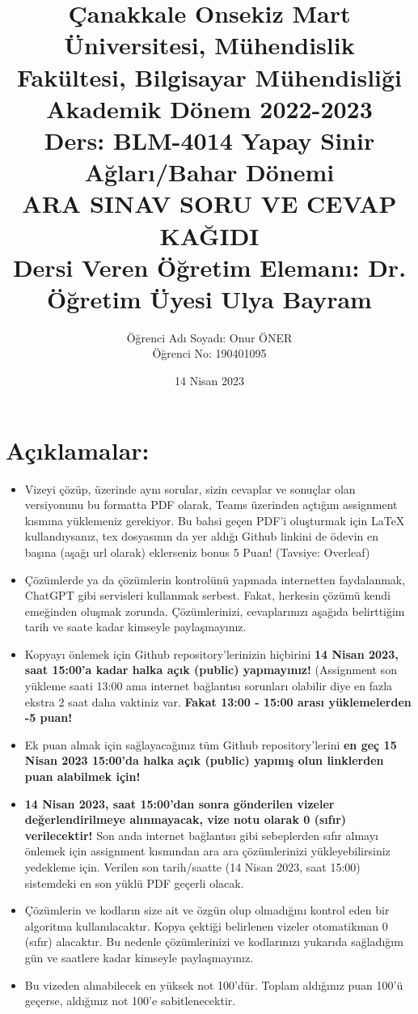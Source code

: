 \documentclass[11pt]{article}
\title{Çanakkale Onsekiz Mart Üniversitesi, Mühendislik Fakültesi, Bilgisayar Mühendisliği Akademik Dönem 2022-2023\\
Ders: BLM-4014 Yapay Sinir Ağları/Bahar Dönemi\\ 
ARA SINAV SORU VE CEVAP KAĞIDI\\
Dersi Veren Öğretim Elemanı: Dr. Öğretim Üyesi Ulya Bayram}
\author{%
\begin{minipage}{\textwidth}
\raggedright
Öğrenci Adı Soyadı: Onur ÖNER\\ %
Öğrenci No: 190401095
\end{minipage}%
}
\date{14 Nisan 2023}
\begin{document}
\maketitle

\vspace{-.5in}
\section*{Açıklamalar:}
\begin{itemize}
    \item Vizeyi çözüp, üzerinde aynı sorular, sizin cevaplar ve sonuçlar olan versiyonunu bu formatta PDF olarak, Teams üzerinden açtığım assignment kısmına yüklemeniz gerekiyor. Bu bahsi geçen PDF'i oluşturmak için LaTeX kullandıysanız, tex dosyasının da yer aldığı Github linkini de ödevin en başına (aşağı url olarak) eklerseniz bonus 5 Puan! (Tavsiye: Overleaf)
    \item Çözümlerde ya da çözümlerin kontrolünü yapmada internetten faydalanmak, ChatGPT gibi servisleri kullanmak serbest. Fakat, herkesin çözümü kendi emeğinden oluşmak zorunda. Çözümlerinizi, cevaplarınızı aşağıda belirttiğim tarih ve saate kadar kimseyle paylaşmayınız. 
    \item Kopyayı önlemek için Github repository'lerinizin hiçbirini \textbf{14 Nisan 2023, saat 15:00'a kadar halka açık (public) yapmayınız!} (Assignment son yükleme saati 13:00 ama internet bağlantısı sorunları olabilir diye en fazla ekstra 2 saat daha vaktiniz var. \textbf{Fakat 13:00 - 15:00 arası yüklemelerden -5 puan!}
    \item Ek puan almak için sağlayacağınız tüm Github repository'lerini \textbf{en geç 15 Nisan 2023 15:00'da halka açık (public) yapmış olun linklerden puan alabilmek için!}
    \item \textbf{14 Nisan 2023, saat 15:00'dan sonra gönderilen vizeler değerlendirilmeye alınmayacak, vize notu olarak 0 (sıfır) verilecektir!} Son anda internet bağlantısı gibi sebeplerden sıfır almayı önlemek için assignment kısmından ara ara çözümlerinizi yükleyebilirsiniz yedekleme için. Verilen son tarih/saatte (14 Nisan 2023, saat 15:00) sistemdeki en son yüklü PDF geçerli olacak.
    \item Çözümlerin ve kodların size ait ve özgün olup olmadığını kontrol eden bir algoritma kullanılacaktır. Kopya çektiği belirlenen vizeler otomatikman 0 (sıfır) alacaktır. Bu nedenle çözümlerinizi ve kodlarınızı yukarıda sağladığım gün ve saatlere kadar kimseyle paylaşmayınız.
    \item Bu vizeden alınabilecek en yüksek not 100'dür. Toplam aldığınız puan 100'ü geçerse, aldığınız not 100'e sabitlenecektir.

\end{itemize}
\end{document}
